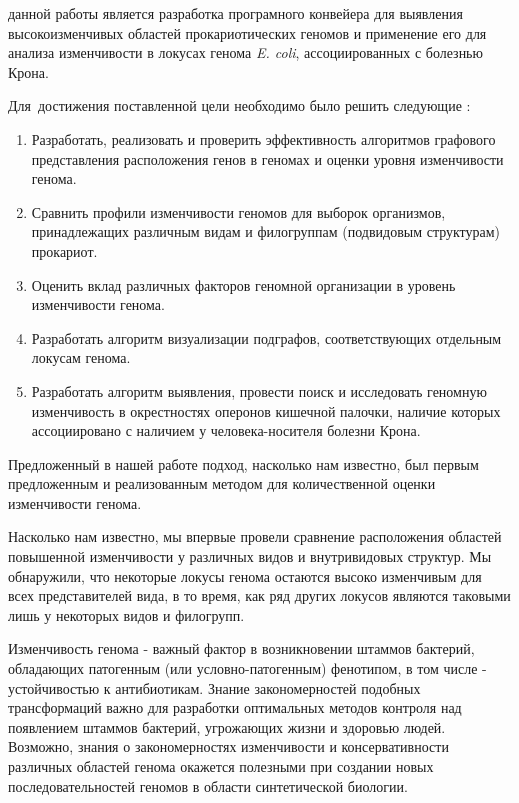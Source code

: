 {\aim} данной работы является разработка програмного конвейера для выявления высокоизменчивых областей прокариотических геномов и применение его для анализа изменчивости в локусах генома \textit{E. coli}, ассоциированных с болезнью Крона.


Для~достижения поставленной цели необходимо было решить следующие {\tasks}:
\begin{enumerate}[beginpenalty=10000] %
  \item Разработать, реализовать и проверить эффективность алгоритмов графового представления расположения генов в геномах и оценки уровня изменчивости генома.
  \item Сравнить профили изменчивости геномов для выборок организмов, принадлежащих различным видам и филогруппам (подвидовым структурам) прокариот.
  \item Оценить вклад различных факторов геномной организации в уровень изменчивости генома. 
  \item Разработать алгоритм визуализации подграфов, соответствующих отдельным локусам генома.
  \item Разработать алгоритм выявления, провести поиск и исследовать геномную изменчивость в окрестностях оперонов кишечной палочки, наличие которых ассоциировано с наличием у человека-носителя болезни Крона.  

\end{enumerate}


{\novelty}
Предложенный в нашей работе подход, насколько нам известно, был первым предложенным и реализованным методом для количественной оценки изменчивости генома. 

Насколько нам известно, мы впервые провели сравнение расположения областей повышенной изменчивости у различных видов и внутривидовых структур. Мы обнаружили, что некоторые локусы генома остаются высоко изменчивым для всех представителей вида, в то время, как ряд других локусов являются таковыми лишь у некоторых видов и филогрупп. 

{\influence} 

Изменчивость генома - важный фактор в возникновении штаммов бактерий, обладающих патогенным (или условно-патогенным) фенотипом, в том числе - устойчивостью к антибиотикам. Знание закономерностей подобных трансформаций важно для разработки оптимальных методов контроля над появлением штаммов бактерий, угрожающих жизни и здоровью людей. Возможно, знания о закономерностях изменчивости и консервативности различных областей генома окажется полезными при создании новых последовательностей геномов в области синтетической биологии. 

